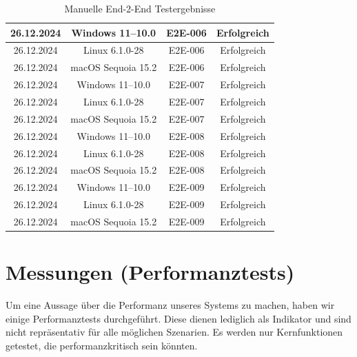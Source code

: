 \documentclass[a4paper,12pt]{report}
\begin{document}
\begin{table}[h!]
\begin{tabular}{|c|c|c|c|}
            26.12.2024     & Windows 11--10.0        & E2E-006           & Erfolgreich       \\ \hline
            26.12.2024     & Linux 6.1.0-28          & E2E-006           & Erfolgreich       \\ \hline
            26.12.2024     & macOS Sequoia 15.2      & E2E-006           & Erfolgreich       \\ \hline
            26.12.2024     & Windows 11--10.0        & E2E-007           & Erfolgreich       \\ \hline
            26.12.2024     & Linux 6.1.0-28          & E2E-007           & Erfolgreich       \\ \hline
            26.12.2024     & macOS Sequoia 15.2      & E2E-007           & Erfolgreich       \\ \hline
            26.12.2024     & Windows 11--10.0        & E2E-008           & Erfolgreich       \\ \hline
            26.12.2024     & Linux 6.1.0-28          & E2E-008           & Erfolgreich       \\ \hline
            26.12.2024     & macOS Sequoia 15.2      & E2E-008           & Erfolgreich       \\ \hline
            26.12.2024     & Windows 11--10.0        & E2E-009           & Erfolgreich       \\ \hline
            26.12.2024     & Linux 6.1.0-28          & E2E-009           & Erfolgreich       \\ \hline
            26.12.2024     & macOS Sequoia 15.2      & E2E-009           & Erfolgreich       \\ \hline

        \end{tabular}
        \caption{Manuelle End-2-End Testergebnisse}\label{tab:e2e-results}
    \end{table}


    \clearpage


    \section{Messungen (Performanztests)}\label{sec:performanztests}
    Um eine Aussage über die Performanz unseres Systems zu machen, haben wir einige Performanztests durchgeführt.
    Diese dienen lediglich als Indikator und sind nicht repräsentativ für alle möglichen Szenarien.
    Es werden nur Kernfunktionen getestet, die performanzkritisch sein könnten.
\end{document}
